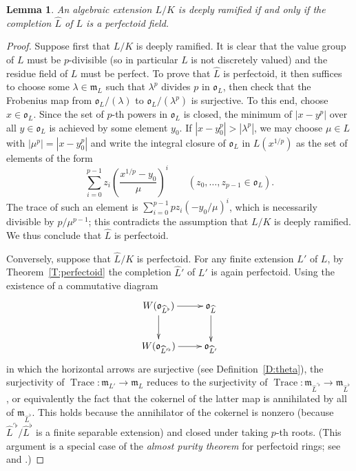 \documentclass[12pt]{amsart}
\newtheorem{lemma}[theorem]{Lemma}
\theoremstyle{definition}
\numberwithin{equation}{theorem}
\newcommand{\frakm}{\mathfrak{m}}
\newcommand{\frako}{\mathfrak{o}}
\DeclareMathOperator{\Trace}{Trace}
\begin{document}
\begin{lemma} \label{L:deeply ramified is perfectoid}
An algebraic extension $L/K$ is deeply ramified if and only if the completion $\widehat{L}$ of $L$ is a perfectoid field.
\end{lemma}
\begin{proof}
Suppose first that $L/K$ is deeply ramified. It is clear that the value group of $L$ must be $p$-divisible (so in particular $L$ is not discretely valued) 
and the residue field of $L$ must be perfect. To prove that $\widehat{L}$ is perfectoid, it then suffices to choose some $\lambda \in \frakm_L$ such that $\lambda^p$ divides $p$ in $\frako_L$, then check that
the Frobenius map from $\frako_L/(\lambda)$ to $\frako_L/(\lambda^p)$ is surjective.
To this end, choose $x \in \frako_L$. Since the set of $p$-th powers in $\frako_L$ is closed,
the minimum of $\left| x - y^p \right|$ over all $y \in \frako_L$ is achieved by some element $y_0$. 
If $\left| x - y_0^p \right| > \left| \lambda^p \right|$, 
we may choose $\mu \in L$ with $\left| \mu^p \right| = \left| x - y_0^p \right|$
and write the integral closure of $\frako_L$ in $L(x^{1/p})$ as the set of elements of the form
\[
\sum_{i=0}^{p-1} z_i \left( \frac{x^{1/p} - y_0}{\mu} \right)^{i} 
\qquad (z_0,\dots,z_{p-1} \in \frako_L).
\]
The trace of such an element is $\sum_{i=0}^{p-1} pz_i (-y_0/\mu)^i$, which is necessarily divisible by $p/\mu^{p-1}$; this contradicts the assumption that $L/K$ is deeply ramified.
We thus conclude that $\widehat{L}$ is perfectoid.

Conversely, suppose that $\widehat{L}/K$ is perfectoid.
For any finite extension $L'$ of $L$, by Theorem~\ref{T:perfectoid}
the completion $\widehat{L}'$ of $L'$ is again perfectoid. 
Using the existence of a commutative diagram
\[
\xymatrix{
W(\frako_{\widehat{L}^\flat}) \ar[r] \ar[d] & \frako_{\widehat{L}} \ar[d] \\
W(\frako_{\widehat{L}^{\prime \flat}}) \ar[r] & \frako_{\widehat{L}'} 
}
\]
in which the horizontal arrows are surjective (see Definition~\ref{D:theta}), the surjectivity
of $\Trace: \frakm_{L'} \to \frakm_{L}$ reduces to the surjectivity of
$\Trace: \frakm_{\widehat{L}^{\prime \flat}} \to \frakm_{\widehat{L}^{\flat}}$,
or equivalently the fact that the cokernel of the latter map
is annihilated by all of $\frakm_{\widehat{L}^{\flat}}$.
This holds because the annihilator of the cokernel is nonzero
(because $\widehat{L}^{\prime \flat}/\widehat{L}^{\flat}$ is a finite separable extension)
and closed under taking $p$-th roots.
(This argument is a special case of the \emph{almost purity theorem} for perfectoid rings;
see \cite[Theorem~5.5.9]{kedlaya-liu1} and \cite[Theorem~7.9]{scholze1}.)
\end{proof}
\end{document}
